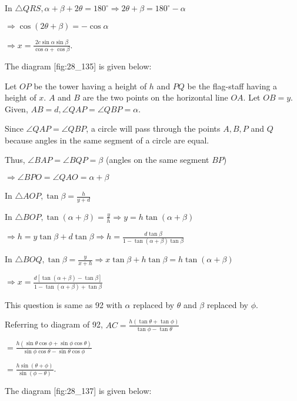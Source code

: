   In $\triangle QRS, \alpha + \beta + 2\theta = 180^\circ \Rightarrow 2\theta + \beta = 180^\circ -
  \alpha$

  $\Rightarrow \cos(2\theta + \beta) = -\cos\alpha$

  $\Rightarrow x = \frac{2c\sin\alpha\sin\beta}{\cos\alpha + \cos\beta}$.

\item The diagram [fig:28_135] is given below:

  \startplacefigure[reference=fig:28_135]
    \externalfigure[28_135.pdf]
  \stopplacefigure

  Let $OP$ be the tower having a height of $h$ and $PQ$ be the flag-staff having a
  height of $x$. $A$ and $B$ are the two points on the horizontal line $OA$. Let
  $OB = y$. Given, $AB = d, \angle QAP = \angle QBP = \alpha$.

  Since $\angle QAP = \angle QBP$, a circle will pass through the points $A, B, P$ and
  $Q$ because angles in the same segment of a circle are equal.

  Thus, $\angle BAP = \angle BQP = \beta$ (angles on the same segment $BP$)

  $\Rightarrow \angle BPO = \angle QAO = \alpha + \beta$

  In $\triangle AOP, \tan\beta = \frac{h}{y + d}$

  In $\triangle BOP, \tan(\alpha + \beta) = \frac{y}{h} \Rightarrow y = h\tan(\alpha + \beta)$

  $\Rightarrow h = y\tan\beta + d\tan\beta\Rightarrow h = \frac{d\tan\beta}{1 - \tan(\alpha +
    \beta)\tan\beta}$

  In $\triangle BOQ, \tan\beta = \frac{y}{x + h}\Rightarrow x\tan\beta + h\tan\beta =
  h\tan(\alpha + \beta)$

  $\Rightarrow x = \frac{d[\tan(\alpha + \beta) - \tan\beta]}{1 - \tan(\alpha + \beta) + \tan\beta}$

\item This question is same as 92 with $\alpha$ replaced by $\theta$ and $\beta$
  replaced by $\phi$.

  Referring to diagram of 92, $AC = \frac{h(\tan\theta + \tan\phi)}{\tan\phi - \tan\theta}$

  $= \frac{h(\sin\theta\cos\phi + \sin\phi\cos\theta)}{\sin\phi\cos\theta - \sin\theta\cos\phi}$

  $= \frac{h\sin(\theta + \phi)}{\sin(\phi - \theta)}$.

\item The diagram [fig:28_137] is given below:


